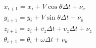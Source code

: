 \begin{equation}
\label{eq:NL}
    \begin{gathered}
       x_{i+1} = x_i + V\cos{\theta}\Delta t + \nu_x  \\
       y_{i+1} = y_i + V\sin{\theta}\Delta t  + \nu_y\\ 
       z_{i+1} = z_i + \bar{v_z}\Delta t + v_z\Delta t + \nu_z\\ 
       \theta_{i+1} = \theta_i + \omega\Delta t + \nu_{\theta} 
    \end{gathered}
\end{equation}